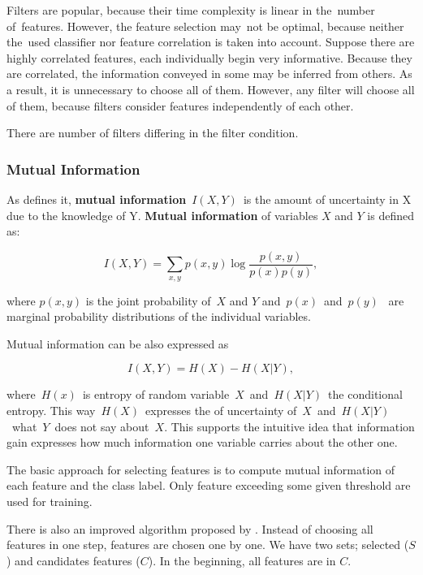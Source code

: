 Filters are popular, because their time complexity is linear in the~number of~features.
However, the feature selection may~not be optimal,
because neither the~used classifier nor feature correlation is taken into account.
Suppose there are highly correlated features,
each individually begin very informative.
Because they are correlated,
the information conveyed in some may be inferred from others.
As a result, it is unnecessary to choose all of them.
However, any filter will choose all of them,
because filters consider features independently of each other.

There are number of filters differing in the filter condition.

\subsubsection{Mutual Information}

As \citet{Hoq14} defines it,
{\bf mutual information}~$I(X, Y)$~is the amount of uncertainty in X due to the knowledge of Y.
{\bf Mutual information} of variables $X$ and $Y$ is defined as:

\begin{equation}
I(X,Y) = \sum_{x,y} p\left(x,y\right)
\log
\frac{p\left(x,y\right)}{p\left(x\right)p\left(y\right)},
\end{equation}

where $p\left(x, y\right)$ is the joint probability of~$X$ and $Y$ and~$p(x)$~and~$p(y)$~
are marginal probability distributions of the individual variables.

Mutual information can be also expressed as

$$I(X, Y) = H(X) - H(X|Y),$$


where~$H(x)$~is entropy of random variable~$X$~and~$H(X|Y)$~the conditional entropy.
This way~$H(X)$~expresses the of uncertainty of~$X$~and~$H(X|Y)$~what~$Y$~does not say about~$X$.
This supports the intuitive idea that information gain expresses how much information one variable carries about the other one.

The basic approach for selecting features is
to compute mutual information of each feature and the class label.
Only feature exceeding some given threshold are used for training.

There is also an improved algorithm proposed by \citet{Hoq14}.
Instead of choosing all features in one step,
features are chosen one by one.
We have two sets; selected ($S$) and candidates features ($C$).
In the beginning, all features are in $C$.

